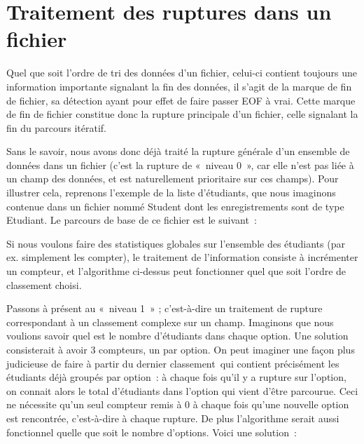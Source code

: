 \section{Traitement des ruptures dans un fichier}

Quel que soit l’ordre de tri des données d’un fichier, celui-ci contient
toujours une information importante signalant la fin des données, il
s’agit de la marque de fin de fichier, sa détection ayant pour effet de
faire passer EOF à vrai. Cette marque de fin de fichier constitue donc
la rupture principale d’un fichier, celle signalant la fin du parcours
itératif.

Sans le savoir, nous avons donc déjà traité la rupture générale d’un
ensemble de données dans un fichier (c’est la rupture de «~niveau 0~»,
car elle n’est pas liée à un champ des données, et est naturellement
prioritaire sur ces champs). Pour illustrer cela, reprenons l’exemple
de la liste d’étudiants, que nous imaginons contenue dans un fichier
nommé Student dont les enregistrements sont de type Etudiant. Le
parcours de base de ce fichier est le suivant~:


Si nous voulons faire des statistiques globales sur l’ensemble des
étudiants (par ex. simplement les compter), le traitement de
l’information consiste à incrémenter un compteur, et l’algorithme
ci-dessus peut fonctionner quel que soit l’ordre de classement choisi.

Passons à présent au «~niveau 1~» ; c’est-à-dire un traitement de
rupture correspondant à un classement complexe sur un champ. Imaginons
que nous voulions savoir quel est le nombre d’étudiants dans chaque
option. Une solution consisterait à avoir 3 compteurs, un par option.
On peut imaginer une façon plus judicieuse de faire à partir du dernier
classement~qui contient précisément les étudiants déjà groupés par
option~: à chaque fois qu’il y a rupture sur l’option, on connait alors
le total d’étudiants dans l’option qui vient d’être parcourue. Ceci ne
nécessite qu’un seul compteur remis à 0 à chaque fois qu’une nouvelle
option est rencontrée, c’est-à-dire à chaque rupture. De plus
l’algorithme serait aussi fonctionnel quelle que soit le nombre
d’options. Voici une solution~: 

